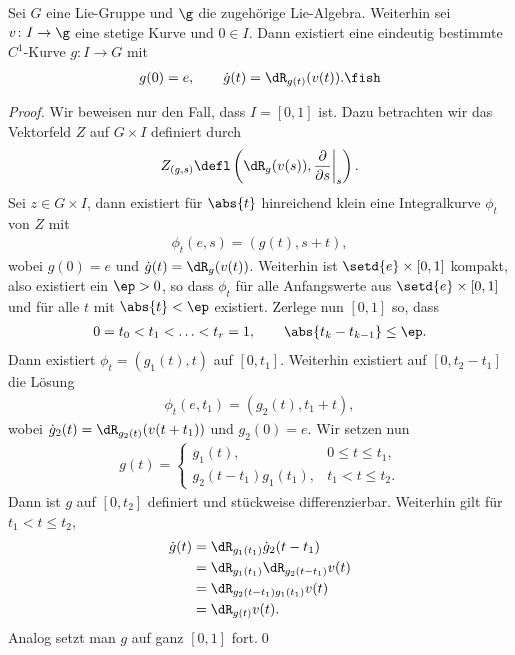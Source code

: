 \documentclass[%
	paper=a5,%
	fleqn,%
	DIV=18,%
	BCOR=0mm,
	fontsize=11pt,
	titlepage=false,%
	bibliography=totoc,
	DIV=18,%
	twoside=true,
	pdftitle=Riemannsche Geometrie,
	pdfauthor=Uwe Semmelmann,
	numbers=noendperiod]%
	{scrbook}
\begin{document}
\begin{lem}
Sei $G$ eine Lie-Gruppe und $\g$ die zugehörige Lie-Algebra. Weiterhin sei $v\colon
I \to \g$ eine stetige Kurve und $0\in I$. Dann existiert eine eindeutig
bestimmte $C^1$-Kurve $g\colon I\to G$ mit
\begin{align*}
g(0) = e,\qquad \dot{g}(t) = \dR_{g(t)}(v(t)).\fish
\end{align*} 
\end{lem}
\begin{proof}
Wir beweisen nur den Fall, dass $I=[0,1]$ ist. Dazu betrachten wir das
Vektorfeld $Z$ auf $G\times I$ definiert durch
\begin{align*}
Z_{(g,s)} \defl \left(\dR_g(v(s)),\frac{\partial}{\partial s}\bigg|_s\right).
\end{align*}
Sei $z\in G\times I$, dann existiert für $\abs{t}$ hinreichend klein eine
Integralkurve $\phi_t$ von $Z$ mit
\begin{align*}
\phi_t(e,s) = (g(t),s+t),
\end{align*} 
wobei $g(0) = e$ und $\dot{g}(t) = \dR_{g}(v(t))$. Weiterhin ist
$\setd{e}\times[0,1]$ kompakt, also existiert ein $\ep > 0$, so dass
$\phi_t$ für alle Anfangswerte aus $\setd{e}\times [0,1]$ und für alle
$t$ mit $\abs{t} < \ep$ existiert. Zerlege nun $[0,1]$ so, dass
\begin{align*}
0 = t_0 < t_1 < \ldots < t_r = 1,\qquad \abs{t_k-t_{k-1}} \le \ep.
\end{align*}
Dann existiert $\phi_t = (g_1(t),t)$ auf $[0,t_1]$. Weiterhin existiert auf
$[0,t_2-t_1]$ die Lösung
\begin{align*}
\phi_t(e,t_1) = (g_2(t),t_1+t),
\end{align*}
wobei $\dot{g}_2(t) = \dR_{g_2(t)}(v(t+t_1))$ und $g_2(0) = e$. Wir setzen nun
\begin{align*}
g(t) = \begin{cases}
g_1(t), & 0\le t \le t_1,\\
g_2(t-t_1)g_1(t_1), & t_1< t\le t_2. 
\end{cases}
\end{align*}
Dann ist $g$ auf $[0,t_2]$ definiert und stückweise differenzierbar. Weiterhin
gilt für $t_1< t \le t_2$,
\begin{align*}
\dot{g}(t) &= \dR_{g_1(t_1)}\dot{g}_2(t-t_1)\\
&=\dR_{g_1(t_1)}\dR_{g_2(t-t_1)}v(t)\\
&=\dR_{g_2(t-t_1)g_1(t_1)}v(t)\\
&=\dR_{g(t)}v(t).
\end{align*}
Analog setzt man $g$ auf ganz $[0,1]$ fort.\qed
\end{proof}
\end{document}
